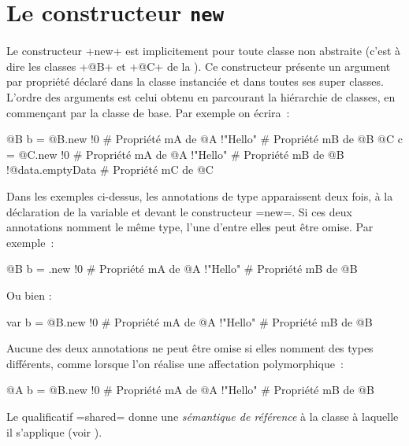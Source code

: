 \section{Le constructeur \texttt{new}}

Le constructeur \ggs+new+ est implicitement pour toute classe non abstraite (c'est à dire les classes \ggs+@B+ et \ggs+@C+ de la ). Ce constructeur présente un argument par propriété déclaré dans la classe instanciée et dans toutes ses super classes. L'ordre des arguments est celui obtenu en parcourant la hiérarchie de classes, en commençant par la classe de base. Par exemple on écrira~:

\begin{galgas}
@B b = @B.new {
  !0 # Propriété mA de @A
  !"Hello" # Propriété mB de @B
}
@C c = @C.new {
  !0 # Propriété mA de @A
  !"Hello" # Propriété mB de @B
  !@data.emptyData # Propriété mC de @C
}
\end{galgas}

Dans les exemples ci-dessus, les annotations de type apparaissent deux fois, à la déclaration de la variable et devant le constructeur \ggs=new=. Si ces deux annotations nomment le même type, l'une d'entre elles peut être omise. Par exemple~:

\begin{galgas}
@B b = .new {
  !0 # Propriété mA de @A
  !"Hello" # Propriété mB de @B
}
\end{galgas}

Ou bien :
\begin{galgas}
var b = @B.new {
  !0 # Propriété mA de @A
  !"Hello" # Propriété mB de @B
}
\end{galgas}

Aucune des deux annotations ne peut être omise si elles nomment des types différents, comme lorsque l'on réalise une affectation polymorphique~:

\begin{galgas}
@A b = @B.new {
  !0 # Propriété mA de @A
  !"Hello" # Propriété mB de @B
}
\end{galgas}








Le qualificatif \ggs=shared= donne une \emph{sémantique de référence} à la classe à laquelle il s'applique (voir ).

